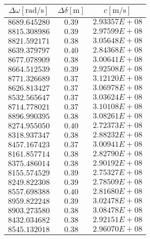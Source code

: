 \documentclass{article} %
\begin{document}
    \begin{table}
        \centering
        \begin{tabular}{||c|c|c||}
            \hline
            $\Delta \omega [\text{rad/s}]$ & $\Delta \delta [\text{m}]$ & $c [\text{m/s}]$ \\
            \hline\hline
            $8689.645280$ & $0.39$ & $2.93357E+08$ \\\hline
            $8815.308986$ & $0.39$ & $2.97599E+08$ \\\hline
            $8821.592171$ & $0.38$ & $3.05648E+08$ \\\hline
            $8639.379797$ & $0.40$ & $2.84368E+08$ \\\hline
            $8677.078909$ & $0.38$ & $3.00641E+08$ \\\hline
            $8664.512539$ & $0.39$ & $2.92508E+08$ \\\hline
            $8771.326689$ & $0.37$ & $3.12120E+08$ \\\hline
            $8626.813427$ & $0.37$ & $3.06978E+08$ \\\hline
            $8532.565647$ & $0.37$ & $3.03624E+08$ \\\hline
            $8714.778021$ & $0.37$ & $3.10108E+08$ \\\hline
            $8896.990395$ & $0.38$ & $3.08261E+08$ \\\hline
            $8274.955050$ & $0.40$ & $2.72373E+08$ \\\hline
            $8318.937347$ & $0.38$ & $2.88232E+08$ \\\hline
            $8457.167423$ & $0.37$ & $3.00941E+08$ \\\hline
            $8161.857714$ & $0.38$ & $2.82790E+08$ \\\hline
            $8375.486014$ & $0.38$ & $2.90192E+08$ \\\hline
            $8155.574529$ & $0.39$ & $2.75327E+08$ \\\hline
            $8249.822308$ & $0.39$ & $2.78509E+08$ \\\hline
            $8557.698388$ & $0.40$ & $2.81680E+08$ \\\hline
            $8959.822248$ & $0.39$ & $3.02478E+08$ \\\hline
            $8903.273580$ & $0.38$ & $3.08478E+08$ \\\hline
            $8432.034682$ & $0.38$ & $2.92151E+08$ \\\hline
            $8545.132018$ & $0.38$ & $2.96070E+08$ \\\hline

\end{tabular}
\end{table}
\end{document}
